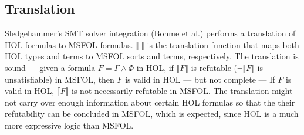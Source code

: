 \documentclass{article}
\begin{document}
	\subsection{Translation}
	\label{sec:trans}
	Sledgehammer's SMT solver 
	integration (Bohme et al.) performs 
	a translation 
	of HOL formulas to MSFOL formulas.
	$\llbracket\ \rrbracket$
	is the translation function 
	that maps both HOL types and 
	terms to MSFOL sorts and terms,
	respectively.
	The translation is sound --- 
	given a formula 
	$F = \Gamma \land \Phi$ in HOL, if 
	$\llbracket F \rrbracket$ is refutable 
	($\neg \llbracket F \rrbracket$
	is unsatisfiable) in MSFOL, then 
	$F$	is valid in HOL --- but not 
	complete --- If $F$ is valid in 
	HOL, $\llbracket F \rrbracket$ is 
	not necessarily refutable in MSFOL. 
	The translation might not carry over 
	enough information about certain HOL 
	formulas so that the their 
	refutability can be concluded in 
	MSFOL, which is	expected, since HOL 
	is a much more expressive logic than 
	MSFOL. 
	
\end{document}
